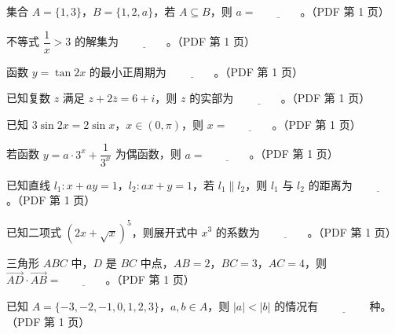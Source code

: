 \begin{question}
集合 $A=\{1,3\}$，$B=\{1,2,a\}$，若 $A\subseteq B$，则 $a=\underline{\qquad\qquad}$。（PDF 第 1 页）

\end{question}
\begin{question}
不等式 $\dfrac1x>3$ 的解集为 $\underline{\qquad\qquad}$。（PDF 第 1 页）

\end{question}
\begin{question}
函数 $y=\tan 2x$ 的最小正周期为 $\underline{\qquad\qquad}$。（PDF 第 1 页）

\end{question}
\begin{question}
已知复数 $z$ 满足 $z+2\overline z=6+i$，则 $z$ 的实部为 $\underline{\qquad\qquad}$。（PDF 第 1 页）

\end{question}
\begin{question}
已知 $3\sin 2x=2\sin x$，$x\in(0,\pi)$，则 $x=\underline{\qquad\qquad}$。（PDF 第 1 页）

\end{question}
\begin{question}
若函数 $y=a\cdot 3^x+\dfrac1{3^x}$ 为偶函数，则 $a=\underline{\qquad\qquad}$。（PDF 第 1 页）

\end{question}
\begin{question}
已知直线 $l_1\colon x+ay=1$，$l_2\colon ax+y=1$，若 $l_1\parallel l_2$，则 $l_1$ 与 $l_2$ 的距离为 $\underline{\qquad\qquad}$。（PDF 第 1 页）

\end{question}
\begin{question}
已知二项式 $(2x+\sqrt{x})^5$，则展开式中 $x^3$ 的系数为 $\underline{\qquad\qquad}$。（PDF 第 1 页）

\end{question}
\begin{question}
三角形 $ABC$ 中，$D$ 是 $BC$ 中点，$AB=2$，$BC=3$，$AC=4$，则 $\overrightarrow{AD}\cdot\overrightarrow{AB}=\underline{\qquad\qquad}$。（PDF 第 1 页）

\end{question}
\begin{question}
已知 $A=\{-3,-2,-1,0,1,2,3\}$，$a,b\in A$，则 $|a|<|b|$ 的情况有 $\underline{\qquad\qquad}$ 种。（PDF 第 1 页）

\end{question}
